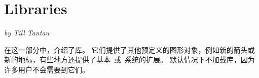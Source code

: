 \part{Libraries}
\label{part-libraries}

{\Large \emph{by Till Tantau}}


\bigskip
\noindent
在这一部分中，介绍了库。 它们提供了其他预定义的图形对象，例如新的箭头或新的地标，有些地方还提供了基本\pgfname\ 或\tikzname\ 系统的扩展。 默认情况下不加载库，因为许多用户不会需要到它们。

\medskip
\noindent
